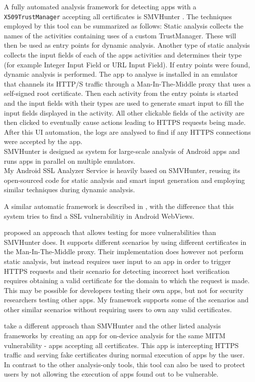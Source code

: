 \documentclass[draft,final]{vutinfth} %
\begin{document}
A fully automated analysis framework for detecting apps with a \texttt{X509TrustManager} accepting all certificates is SMVHunter
\cite{Sounthiraraj}. The techniques employed by this tool can be summarized as follows: Static analysis collects the names of the activities containing uses of a custom TrustManager. These will then be used as entry points for dynamic analysis. Another type of static analysis collects the input fields of each of the apps activities and determines their type (for example Integer Input Field or URL Input Field). If entry points were found, dynamic analysis is performed. The app to analyse is installed in an emulator that channels its HTTP/S traffic through a Man-In-The-Middle proxy that uses a self-signed root certificate. Then each activity from the entry points is started and the input fields with their types are used to generate smart input to fill the input fields displayed in the activity. All other clickable fields of the activity are then clicked to eventually cause actions leading to HTTPS requests being made. After this UI automation, the logs are analysed to find if any HTTPS connections were accepted by the app.\\
SMVHunter is designed as system for large-scale analysis of Android apps and runs apps in parallel on multiple emulators.\\
My Android SSL Analyzer Service is heavily based on SMVHunter, reusing its open-sourced code \cite{SMVHunterGit} for static analysis and smart input generation and employing similar techniques during dynamic analysis.

A similar automatic framework is described in \cite{Zuo}, with the difference that this system tries to find a SSL vulnerabilitiy in Android WebViews.

\cite{Gagnon} proposed an approach that allows testing for more vulnerabilities than SMVHunter does. It supports different scenarios by using different certificates in the Man-In-The-Middle proxy. Their implementation does however not perform static analysis, but instead requires user input to an app in order to trigger HTTPS requests and their scenario for detecting incorrect host verification requires obtaining a valid certificate for the domain to which the request is made. This may be possible for developers testing their own apps, but not for security researchers testing other apps. My framework supports some of the scenarios and other similar scenarios without requiring users to own any valid certificates. 

\cite{Conti} take a different approach than SMVHunter and the other listed analysis frameworks by creating an app for on-device analysis for the same MITM vulnerability - apps accepting all certificates. This app is intercepting HTTPS traffic and serving fake certificates during normal execution of apps by the user.  In contrast to the other analysis-only tools, this tool can also be used to protect users by not allowing the execution of apps found out to be vulnerable.
\end{document}

